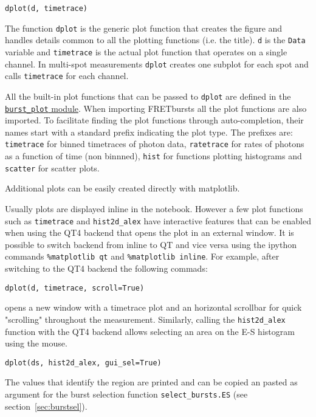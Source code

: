 \begin{verbatim}
dplot(d, timetrace)
\end{verbatim}

The function \verb|dplot| is the generic plot function that creates the figure
and handles details common to all the plotting functions (i.e. the title).
\verb|d| is the \verb|Data| variable and \verb|timetrace| is the actual plot
function that operates on a single channel. In multi-spot measurements
\verb|dplot| creates one subplot for each spot and calls \verb|timetrace| for
each channel.

All the built-in plot functions that can be passed to 
\verb|dplot| are defined in the 
\href{http://fretbursts.readthedocs.org/en/latest/plots.html}{\texttt{burst\_plot} module}. 
When importing FRETbursts all the plot functions are also imported. 
To facilitate finding the plot functions through auto-completion, 
their names start with a standard prefix indicating the
plot type. The prefixes are: \verb|timetrace| for binned timetraces
of photon data, \verb|ratetrace| for rates of photons as a function of time (non
binnned), \verb|hist| for functions plotting histograms and \verb|scatter| for
scatter plots.

Additional plots can be easily created directly with matplotlib.

Usually plots are displayed inline in the notebook. However a few plot functions
 such as \verb|timetrace| and \verb|hist2d_alex| have interactive features that
can be enabled when using the QT4 backend that opens the plot in an external
window. It is possible to switch backend from inline to QT and vice versa using
the ipython commands \verb|%matplotlib qt|
and \verb|%matplotlib inline|. For example, after switching to the QT4 backend
the following commads:

\begin{verbatim}
dplot(d, timetrace, scroll=True)
\end{verbatim}

opens a new window with a timetrace plot and an horizontal scrollbar for quick
"scrolling" throughout the measurement.
Similarly, calling the \verb|hist2d_alex| function with the QT4 backend allows
selecting an area on the E-S histogram using the mouse.

\begin{verbatim}
dplot(ds, hist2d_alex, gui_sel=True)
\end{verbatim}

The values that identify the region are printed and can be copied an pasted as
argument for the burst selection function \verb|select_bursts.ES| (see
section~\ref{sec:burstsel}).


